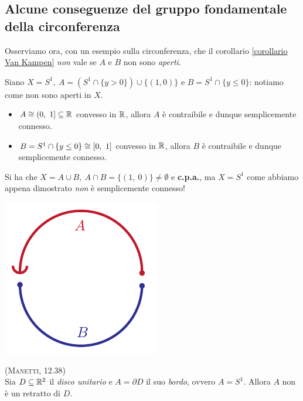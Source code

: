 \subsection{Alcune conseguenze del gruppo fondamentale della circonferenza}
Osserviamo ora, con un esempio sulla circonferenza, che il corollario \ref{corollario Van Kampen} \textit{non} vale se $A$ e $B$ non sono \textit{aperti}.
\begin{example}
	Siano $X=S^1,\ A=(S^1\cap\{y>0\})\cup \{(1,0)\}$ e $B=S^1\cap\{y\leq 0\}$: notiamo come non sono aperti in $X$.\\
\begin{minipage}{.81\linewidth}
\begin{itemize}
	\item $A\cong (0,\ 1]\subseteq \mathbb{R}$ convesso in $\mathbb{R}$, allora $A$ è contraibile e dunque semplicemente connesso.
	\item $B=S^1\cap\{y\leq 0\}\cong\left[0,\ 1\right]$ convesso in $\mathbb{R}$, allora $B$ è contraibile e dunque semplicemente connesso.
\end{itemize}
Si ha che $X=A\cup B,\ A\cap B=\{(1,\ 0)\}\neq\emptyset$ e \textbf{c.p.a.}, ma $X=S^1$ come abbiamo appena dimostrato \textit{non} è semplicemente connesso!
	\end{minipage}
	\begin{minipage}{.18\linewidth}\vspace{-6mm}
		\includegraphics[trim=0cm 0cm 0cm 0cm,clip,scale=0.6]{images/notvankampen.pdf}
	\end{minipage}
\end{example}
\begin{corollary} \textsc{(Manetti, 12.38)} \label{circonferenza non retratto disco}\\
Sia $D\subseteq\mathbb{R}^2$ il \textit{disco unitario} e $A=\partial{D}$ il suo \textit{bordo}, ovvero $A=S^1$. Allora $A$ non è un retratto di $D$.
\end{corollary}
